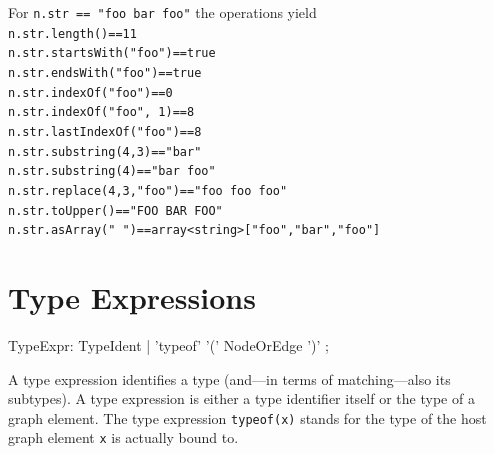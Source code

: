\begin{example}
For \texttt{n.str == "foo bar foo"} the operations yield \\
\texttt{n.str.length()==11} \\
\texttt{n.str.startsWith("foo")==true} \\
\texttt{n.str.endsWith("foo")==true} \\
\texttt{n.str.indexOf("foo")==0} \\
\texttt{n.str.indexOf("foo", 1)==8} \\
\texttt{n.str.lastIndexOf("foo")==8} \\
\texttt{n.str.substring(4,3)=="bar"} \\
\texttt{n.str.substring(4)=="bar foo"} \\
\texttt{n.str.replace(4,3,"foo")=="foo foo foo"} \\
\texttt{n.str.toUpper()=="FOO BAR FOO"} \\
\texttt{n.str.asArray(" ")==array<string>["foo","bar","foo"]} \\
\end{example}


\section{Type Expressions}
\label{typeexpressions}

\begin{rail}
  TypeExpr: TypeIdent | 'typeof' '(' NodeOrEdge ')' ;
\end{rail}
A type expression identifies a type (and---in terms of matching---also its subtypes).
A type expression is either a type identifier itself or the type of a graph element.
The type expression \texttt{typeof(x)} stands for the type of the host graph element \texttt{x} is actually bound to.

